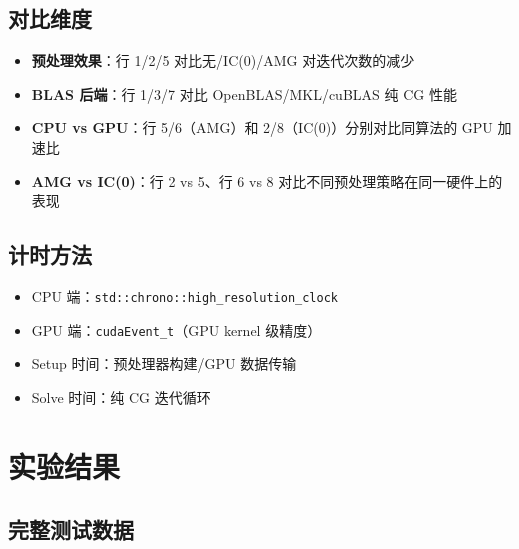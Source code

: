 \documentclass[12pt,a4paper]{ctexart}
\begin{document}
\subsection{对比维度}

\begin{itemize}
\item \textbf{预处理效果}：行 1/2/5 对比无/IC(0)/AMG 对迭代次数的减少
\item \textbf{BLAS 后端}：行 1/3/7 对比 OpenBLAS/MKL/cuBLAS 纯 CG 性能
\item \textbf{CPU vs GPU}：行 5/6（AMG）和 2/8（IC(0)）分别对比同算法的 GPU 加速比
\item \textbf{AMG vs IC(0)}：行 2 vs 5、行 6 vs 8 对比不同预处理策略在同一硬件上的表现
\end{itemize}

\subsection{计时方法}

\begin{itemize}
\item CPU 端：\texttt{std::chrono::high\_resolution\_clock}
\item GPU 端：\texttt{cudaEvent\_t}（GPU kernel 级精度）
\item Setup 时间：预处理器构建/GPU 数据传输
\item Solve 时间：纯 CG 迭代循环
\end{itemize}

\section{实验结果}

\subsection{完整测试数据}
\end{document}
